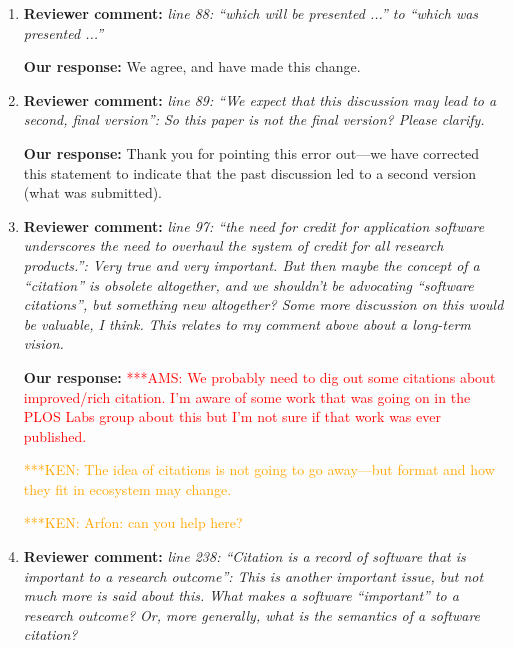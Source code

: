 \documentclass{article}
\newcommand{\niemnote}[1]{ {\textcolor{orange} { ***KEN: #1 }}} %
\newcommand{\asnote}[1]{ {\textcolor{red} { ***AMS: #1 }}} %
\begin{document}
\begin{enumerate}
\niemnote{We agree that the main findings are the principles, and the use cases/discussion are the main to reach those.  Don't agree that the principles are assumptions or preliminary, but reflect current knowledge and experience}

\niemnote{I will work on this, but may need help}

\item \textbf{Reviewer comment:}
\emph{line 88: ``which will be presented ...'' to ``which was presented ...''}

\textbf{Our response:}
We agree, and have made this change.


\item \textbf{Reviewer comment:}
\emph{line 89: ``We expect that this discussion may lead to a second, final version'': So this paper is not the final version? Please clarify.}

\textbf{Our response:}
Thank you for pointing this error out---we have corrected this statement to indicate that the past discussion led to a second version (what was submitted).


\item \textbf{Reviewer comment:}
\emph{line 97: ``the need for credit for application software underscores the need to overhaul the system of credit for all research products.'': Very true and very important. But then maybe the concept of a ``citation'' is obsolete altogether, and we shouldn't be advocating ``software citations'', but something new altogether? Some more discussion on this would be valuable, I think. This relates to my comment above about a long-term vision.}

\textbf{Our response:}
\asnote{We probably need to dig out some citations about improved/rich citation. I'm aware of some work that was going on in the PLOS Labs group about this but I'm not sure if that work was ever published.}

\niemnote{The idea of citations is not going to go away---but format and how they fit in ecosystem may change.}

\niemnote{Arfon: can you help here?}

\item \textbf{Reviewer comment:}
\emph{line 238: ``Citation is a record of software that is important to a research outcome'': This is another important issue, but not much more is said about this. What makes a software ``important'' to a research outcome? Or, more generally, what is the semantics of a software citation?}


\end{enumerate}
\end{document}
